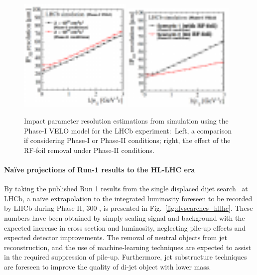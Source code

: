 \begin{figure}[t]
\centerline{
\includegraphics[width=0.48\textwidth]{figures/velo_ph21.pdf}
\includegraphics[width=0.48\textwidth]{figures/velo_ph22.pdf}
}
  \caption{Impact parameter resolution estimations from simulation using the Phase-I VELO model for the LHCb experiment:~Left, a comparison if considering Phase-I or Phase-II conditions; right, the effect of the RF-foil removal under Phase-II conditions.}
  \label{fig:veloip_hllhc}
\end{figure}

\paragraph{Na\"ive projections of Run-1 results to the HL-LHC era}

By taking the published Run 1 results from the single displaced dijet search~\cite{Aaij:2017mic} at LHCb, a na\"ive extrapolation to the integrated luminosity foreseen to be recorded by LHCb during Phase-II, 300 \invfb, is presented in Fig.~\ref{fig:dvsearches_hllhc}. These numbers have been obtained by simply scaling signal and background with the expected increase in cross section and luminosity, neglecting pile-up effects and expected detector improvements.
The removal of neutral objects from jet reconstruction, and the use of machine-learning techniques are expected to assist in the required suppression of pile-up. Furthermore, jet substructure techniques are foreseen to improve the quality of di-jet object with lower mass.

